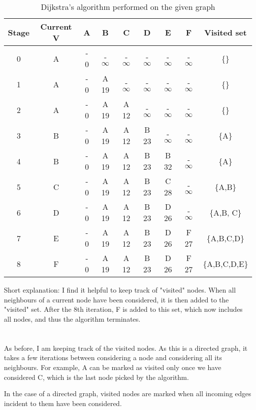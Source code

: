 \documentclass[tikz]{article}
\begin{document}
\section{}
\begin{table}[h]
	\centering

\begin{tabular}{c|c|cccccc|c}

	Stage& Current V & A & B & C & D & E & F & Visited set\\ 
	\hline 
	0 & A & - 0 & - $\infty$ & - $\infty$ &- $\infty$  &- $\infty$  &- $\infty$  & \{\}\\ 
	1 & A & - 0 & A 19 & - $\infty$ & - $\infty$ &- $\infty$  &- $\infty$  & \{\}\\
	2 & A & - 0 & A 19 & A 12&- $\infty$ &- $\infty$ &- $\infty$ & \{\} \\
	3 & B & - 0 & A 19 & A 12 & B 23 & - $\infty$&- $\infty$ & \{A\}\\
	4 & B & - 0 & A 19 & A 12 & B 23 & B 32 & - $\infty$ &\{A\}\\
	5 & C & - 0 & A 19 & A 12 & B 23 & C 28 & - $\infty$ &\{A,B\}\\
	6 & D & - 0 & A 19 & A 12 & B 23 & D 26 & - $\infty$ &\{A,B, C\}\\
	7 & E & - 0 & A 19 & A 12 & B 23 & D 26 & F 27 &\{A,B,C,D\} \\
	8 & F & - 0 & A 19 & A 12 & B 23 & D 26 & F 27 &\{A,B,C,D,E\} \\

\end{tabular} 

\caption{Dijkstra's algorithm performed on the given graph}
\end{table}
Short explanation: I find it helpful to keep track of "visited" nodes. When all neighbours of a current node have been considered, it is then added to the "visited" set. After the 8th iteration, F is added to this set, which now includes all nodes, and thus the algorithm terminates.
\section{}
As before, I am keeping track of the visited nodes. As this is a directed graph, it takes a few iterations between considering a node and considering all its neighbours. For example, A can be marked as visited only once we have considered C, which is the last node picked by the algorithm.

In the case of a directed graph, visited nodes are marked when all incoming edges incident to them have been considered.
\end{document}

